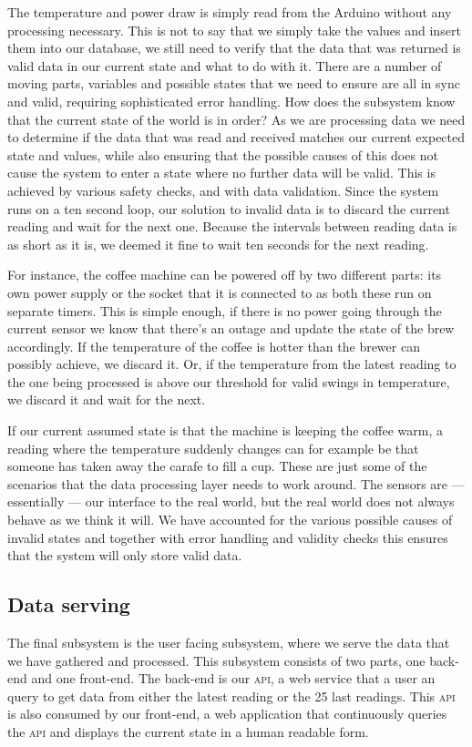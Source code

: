 \documentclass[12pt,a4paper,oneside,article]{memoir}
\numberwithin{equation}{chapter}
\begin{document}
The temperature and power draw is simply read from the Arduino without any
processing necessary. This is not to say that we simply take the values and
insert them into our database, we still need to verify that the data that was
returned is valid data in our current state and what to do with it. There are a
number of moving parts, variables and possible states that we need to ensure are
all in sync and valid, requiring sophisticated error handling. How does the
subsystem know that the current state of the world is in order? As we are
processing data we need to determine if the data that was read and received
matches our current expected state and values, while also ensuring that the
possible causes of this does not cause the system to enter a state where no
further data will be valid. This is achieved by various safety checks, and with
data validation. Since the system runs on a ten second loop, our solution to
invalid data is to discard the current reading and wait for the next one.
Because the intervals between reading data is as short as it is, we deemed it
fine to wait ten seconds for the next reading.

For instance, the coffee machine can be powered off by two different parts: its
own power supply or the socket that it is connected to as both these run on
separate timers. This is simple enough, if there is no power going through the
current sensor we know that there's an outage and update the state of the brew
accordingly. If the temperature of the coffee is hotter than the brewer can
possibly achieve, we discard it. Or, if the temperature from the latest reading
to the one being processed is above our threshold for valid swings in
temperature, we discard it and wait for the next.

If our current assumed state is that the machine is keeping the coffee warm, a
reading where the temperature suddenly changes can for example be that someone
has taken away the carafe to fill a cup. These are just some of the scenarios
that the data processing layer needs to work around. The sensors are ---
essentially --- our interface to the real world, but the real world does not
always behave as we think it will. We have accounted for the various possible
causes of invalid states and together with error handling and validity checks
this ensures that the system will only store valid data.

\subsection{Data serving}\label{sec:data-serving}
The final subsystem is the user facing subsystem, where we serve the data that
we have gathered and processed. This subsystem consists of two parts, one
back-end and one front-end. The back-end is our \textsc{api}, a web service that
a user an query to get data from either the latest reading or the 25 last
readings. This \textsc{api} is also consumed by our front-end, a web application
that continuously queries the \textsc{api} and displays the current state in a
human readable form.
\end{document}
